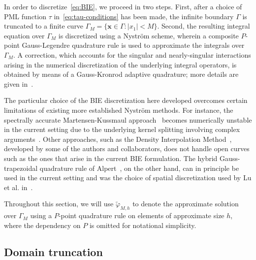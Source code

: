 \documentclass[review,hidelinks,onefignum,onetabnum]{siamart220329}
\newcommand{\bx}{\mathbf{x}}
\newcommand{\tvarphi}{\widetilde \varphi}
\begin{document}
In order to discretize~\cref{eq:BIE}, we proceed in two steps. First, after a choice of PML function $\tau$ in~\eqref{eq:tau-conditions} has been made, the infinite boundary $\Gamma$ is truncated to a finite curve $\Gamma_M = \{ \bx \in \Gamma : |x_1| < M \}$. Second, the resulting integral equation over $\Gamma_M$ is discretized using a Nyström scheme, wherein a composite $P$-point Gauss-Legendre quadrature rule is used to approximate the integrals over
$\Gamma_{M}$. A correction, which  accounts
for the singular and nearly-singular interactions arising in the numerical discretization of the underlying integral operators, is obtained by means of a
Gauss-Kronrod adaptive quadrature; more details are given in~. 

The particular choice of the BIE discretization here developed overcomes certain limitations of existing more established Nystr\"om methods. For instance, the spectrally accurate Martensen-Kussmaul approach~\cite[section 3.6]{colton1998inverse} becomes numerically unstable in the current setting due to the underlying kernel splitting  involving complex arguments~\cite{lu2014efficient}. Other approaches, such as the Density Interpolation Method~\cite{perez2019harmonic,faria2021general}, developed by some of the authors and collaborators, does not handle open curves such as the ones that arise in the current BIE formulation. The hybrid Gauss-trapezoidal quadrature rule of Alpert~\cite{alpert1999hybrid}, on the other hand, can in principle be used in the current setting and was the choice of spatial discretization used by Lu et al. in~\cite{lu2018perfectly}.

Throughout this section, we will use $\tvarphi_{M,h}$ to denote the approximate solution over $\Gamma_{M}$ using a $P$-point quadrature rule on elements of approximate size $h$, where the dependency on $P$ is omitted for notational simplicity. 

\subsection{Domain truncation}\label{sec:truncation}
\end{document}
